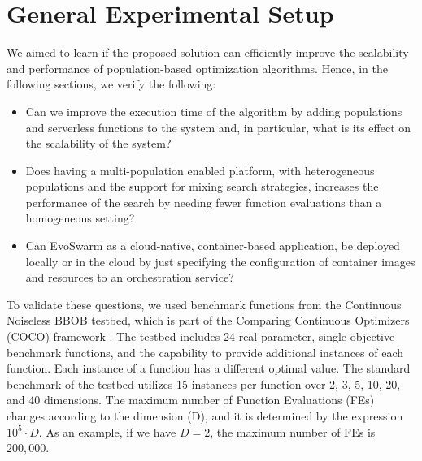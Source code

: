 \documentclass[review]{elsarticle}
\begin{document}
\section{General Experimental Setup} 
\label{setup}

We aimed to learn if the proposed solution can efficiently
improve the scalability and performance of population-based optimization
algorithms. %
Hence, in the following sections, we verify the following:


\begin{itemize}
\item Can we improve the execution time of the algorithm by adding populations
 and serverless functions to the system and, in particular, what is its effect on the scalability of the system? 
 
\item Does having a multi-population enabled platform, with heterogeneous populations and
the support for mixing search strategies,  increases the performance of the
search by needing fewer function evaluations than a homogeneous setting? %

\item Can EvoSwarm as a cloud-native, container-based application,  be deployed
locally or in the cloud by just specifying the configuration of container images
and resources to an orchestration service?
\end{itemize}


To validate these questions, we used benchmark functions from the Continuous
Noiseless BBOB testbed, which is part of the Comparing Continuous Optimizers
(COCO) framework \cite{hansen2016coco}. The testbed includes 24 real-parameter,
single-objective benchmark functions, and the capability to provide additional
instances of each function. Each instance of a function has a different optimal
value. The standard benchmark of the testbed utilizes 15 instances per function
over 2, 3, 5, 10, 20, and 40 dimensions. The maximum number of Function
Evaluations (FEs) changes according to the dimension (D), and it is determined
by the expression $10^5 \cdot D$. As an example, if we have $D = 2$, the
maximum number of FEs is $200,000$.
\end{document}
